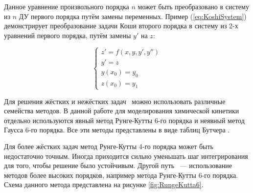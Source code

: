 Данное уравнение произвольного порядка $n$ может быть преобразовано в систему из $n$ ДУ первого порядка путём замены переменных. Пример (\ref{eq:KoshiSystem}) демонстрирует преобразование задачи Коши второго порядка в систему из 2-х уравнений первого порядка, путём замены $y'$ на $z$:

\begin{equation}
    \begin{cases}
        z' = f(x, y, y', y'')\\
        y' = z\\
        y(x_0) = y_0\\
        z(x_0) = y_1
    \end{cases}
    \label{eq:KoshiSystem}
\end{equation}

Для решения жёстких и нежёстких задач~\cite{Article3, Article4} можно использовать различные семейства методов. В данной работе для моделирования химической кинетики отдельно используются явный метод Рунге-Кутты 6-го порядка и неявный метод Гаусса 6-го порядка. Все эти методы представлены в виде таблиц Бутчера \cite{book1, cite_1_3}.

Для более жёстких задач метод Рунге-Кутты 4-го порядка может быть недостаточно точным. Иногда приходится сильно уменьшать шаг
интегрирования для того, чтобы решение было устойчивым. Другой путь ~--- использование методов более высоких порядков, например метода Рунге-Кутты 6-го порядка. Схема данного метода представлена на рисунке \ref{fig:RungeKutta6}.

